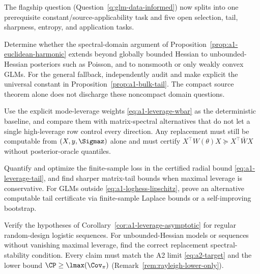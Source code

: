 \documentclass[../../main.tex]{subfiles}
\begin{document}
The flagship question (Question~\ref{q:glm-data-informed}) now splits into one prerequisite
constant/source-applicability task and five open selection, tail, sharpness, entropy, and
application tasks.

\begin{question}
\label{q:a1-poincare}
Determine whether the spectral-domain argument of
Proposition~\ref{prop:a1-euclidean-harmonic} extends beyond globally bounded Hessian to
unbounded-Hessian posteriors such as Poisson, and to nonsmooth or only weakly convex GLMs. For the
general fallback, independently audit and make explicit the universal constant in
Proposition~\ref{prop:a1-bulk-tail}. The compact source theorem
\cite{Veysseire2011SpectralGap} alone does not discharge these noncompact domain questions.
\end{question}

\begin{question}
\label{q:a1-barw}
Use the explicit mode-leverage weights \eqref{eq:a1-leverage-wbar} as the deterministic baseline,
and compare them with matrix-spectral alternatives that do not let a single high-leverage row
control every direction. Any replacement must still be computable from $(X,y,\Sigmaz)$ alone and
must certify $X^\top W(\theta)X\succeq X^\top\bar W X$ without posterior-oracle quantiles.
\end{question}

\begin{question}
\label{q:a1-tail}
Quantify and optimize the finite-sample loss in the certified radial bound
\eqref{eq:a1-leverage-tail}, and find sharper matrix-tail bounds when maximal leverage is
conservative.
For GLMs outside \eqref{eq:a1-loghess-lipschitz}, prove an alternative computable tail certificate
via finite-sample Laplace bounds \cite{KasprzakGiordanoBroderick2025} or a self-improving bootstrap.
\end{question}

\begin{question}
\label{q:a1-sharp}
Verify the hypotheses of Corollary~\ref{cor:a1-leverage-asymptotic} for regular random-design
logistic sequences. For unbounded-Hessian models or sequences without vanishing maximal leverage,
find the correct replacement spectral-stability condition. Every claim must match the A2 limit
\eqref{eq:a2-target} and the lower bound
$\CP\ge\lmax(\Cov_\pi)$ (Remark~\ref{rem:rayleigh-lower-only}).
\end{question}
\end{document}
